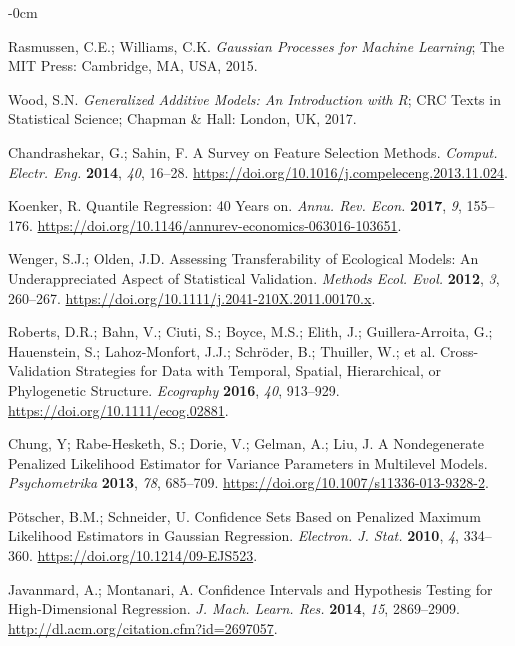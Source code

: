 \documentclass[entropy,article,accept,pdftex,moreauthors]{Definitions/mdpi}
\begin{document}
\begin{adjustwidth}{-\extralength}{0cm}
\begin{thebibliography}{999}
Rasmussen, C.E.;  Williams, C.K.
\emph{Gaussian {Processes} for {Machine Learning}}; The
MIT Press: Cambridge, MA, USA, 2015.

Wood, S.N. \emph{Generalized Additive Models: An Introduction
with {R}}; {CRC Texts} in {Statistical Science}; Chapman \& Hall: London, UK, 2017. %

Chandrashekar,  G.; Sahin, F. A Survey on Feature
Selection Methods.  \emph{Comput. Electr. Eng.} \textbf{2014}, \emph{40}, 
16--28. \url{https://doi.org/10.1016/j.compeleceng.2013.11.024}.

Koenker, R. Quantile {Regression}: 40 {Years on}. 
\emph{Annu. Rev. Econ.} \textbf{2017}, \emph{9},  155--176.
\url{https://doi.org/10.1146/annurev-economics-063016-103651}.

Wenger, S.J.; Olden, J.D.  Assessing Transferability
of Ecological Models: An Underappreciated Aspect of Statistical
Validation.  \emph{Methods Ecol. Evol.} \textbf{2012}, \emph{3},  260--267.
\url{https://doi.org/10.1111/j.2041-210X.2011.00170.x}.

Roberts, D.R.; Bahn, V.; Ciuti, S.; Boyce, M.S.; Elith, J.; Guillera-Arroita, G.; Hauenstein, S.; Lahoz-Monfort, J.J.; Schröder, B.; Thuiller, W.; et al. Cross-Validation Strategies for Data with Temporal, Spatial,
Hierarchical, or Phylogenetic Structure.  \emph{Ecography} \textbf{2016}, \emph{40}, 
913--929. \url{https://doi.org/10.1111/ecog.02881}.

Chung, Y; Rabe-Hesketh, S.; Dorie, V.; Gelman, A.; Liu, J.  {A {Nondegenerate Penalized Likelihood Estimator}
for {Variance Parameters} in {Multilevel Models}.}
\emph{Psychometrika} \textbf{2013}, \emph{78},  685--709.
\url{https://doi.org/10.1007/s11336-013-9328-2}.

Pötscher, B.M.;  Schneider, U. Confidence Sets
Based on Penalized Maximum Likelihood Estimators in {Gaussian}
Regression.  \emph{Electron. J. Stat.} \textbf{2010}, \emph{4}, 334--360. \url{https://doi.org/10.1214/09-EJS523}.

Javanmard, A.; Montanari, A. Confidence Intervals and
Hypothesis Testing for High-Dimensional Regression.  \emph{ J.
 Mach. Learn. Res.} \textbf{2014}, \emph{15}, 2869--2909.
\url{http://dl.acm.org/citation.cfm?id=2697057}.


\end{thebibliography}
\end{adjustwidth}
\end{document}
